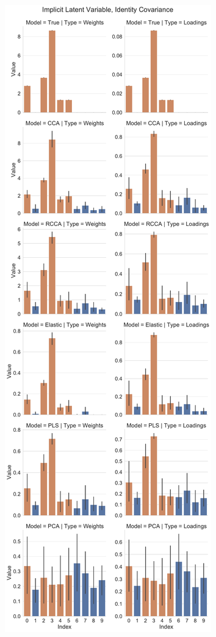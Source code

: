 \begin{figure}
\centering
\begin{subfigure}{0.49\linewidth}
\centering
\includegraphics[width=\linewidth]{figures/simulated/implicit/Combined_Weights_Loadings_with_Error_Bars_Identity}

\end{subfigure}
\end{figure}
